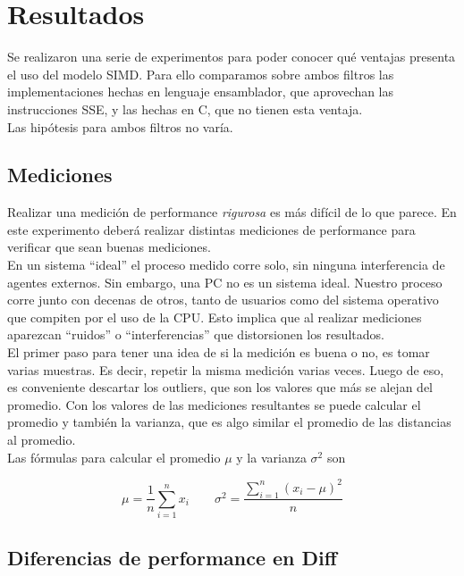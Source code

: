 \documentclass[10pt,a4paper,spanish]{article}
\begin{document}
\section{Resultados}

Se realizaron una serie de experimentos para poder conocer qué ventajas presenta el uso del modelo SIMD. Para ello comparamos sobre ambos filtros las implementaciones hechas en lenguaje ensamblador, que aprovechan las instrucciones SSE, y las hechas en C, que no tienen esta ventaja. \\

Las hipótesis para ambos filtros no varía.

\subsection{Mediciones}

Realizar una medición de performance \emph{rigurosa} es más difícil de lo que parece. En este experimento deberá realizar distintas mediciones de performance para verificar que sean buenas mediciones. \\

En un sistema ``ideal'' el proceso medido corre solo, sin ninguna interferencia de agentes externos. Sin embargo, una PC no es un sistema ideal. Nuestro proceso corre junto con decenas de otros, tanto de usuarios como del sistema operativo que compiten por el uso de la CPU. Esto implica que al realizar mediciones aparezcan ``ruidos'' o ``interferencias'' que distorsionen los resultados. \\

El primer paso para tener una idea de si la medición es buena o no, es tomar varias muestras. Es decir, repetir la misma medición varias veces. Luego de eso, es conveniente descartar los outliers, que son los valores que más se alejan del promedio. Con los valores de las mediciones resultantes se puede calcular el promedio y también la varianza, que es algo similar el promedio de las distancias al promedio. \\

Las fórmulas para calcular el promedio $\mu$ y la varianza $\sigma^2$ son

$$
\mu = \frac{1}{n}\sum_{i=1}^{n} x_i \qquad \sigma^2 = \frac{\displaystyle\sum_{i=1}^{n}(x_i - \mu)^2} {n}
$$

\subsection{Diferencias de performance en Diff}
\end{document}
